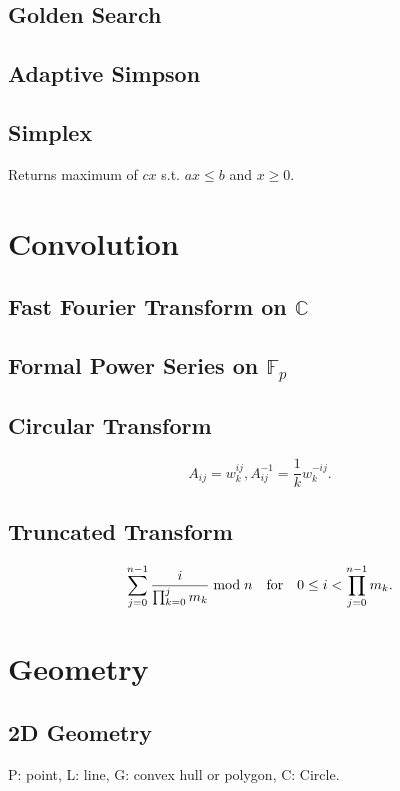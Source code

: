\documentclass{article}
\begin{document}
\begin{multicols}{3}
    \subsection{Golden Search}
    
    \subsection{Adaptive Simpson}
    
    \subsection{Simplex}
    Returns maximum of $cx$ s.t. $ax\le b$ and $x\ge 0$.
    
    

    \section{Convolution}
    \subsection{Fast Fourier Transform on $\mathbb{C}$}
    
    \subsection{Formal Power Series on $\mathbb{F}_p$}
    
    
    \subsection{Circular Transform}
    $$A_{ij}=w_k^{ij}, A^{-1}_{ij}=\frac{1}{k}w_k^{-ij}.$$
    \subsection{Truncated Transform}
    $$\sum_{j=0}^{n-1}\frac{i}{\prod_{k=0}^{j}m_k}\bmod n\quad{\rm for}\quad 0\le i < \prod_{j=0}^{n-1}m_k.$$

    \section{Geometry}
    
    \subsection{2D Geometry}
    P: point, L: line, G: convex hull or polygon, C: Circle.
    

\end{multicols}
\end{document}

